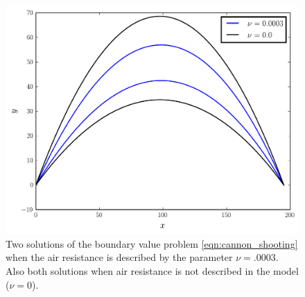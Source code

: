 \begin{figure}
\includegraphics[width=\textwidth]{Cannon_Shooting.pdf}
\caption{Two solutions of the boundary value problem \eqref{eqn:cannon_shooting} when the air resistance is described by the parameter $\nu = .0003$.
Also both solutions when air resistance is not described in the model ($\nu = 0$).}
\label{fig:shooting_cannon_comparison2}
\end{figure}